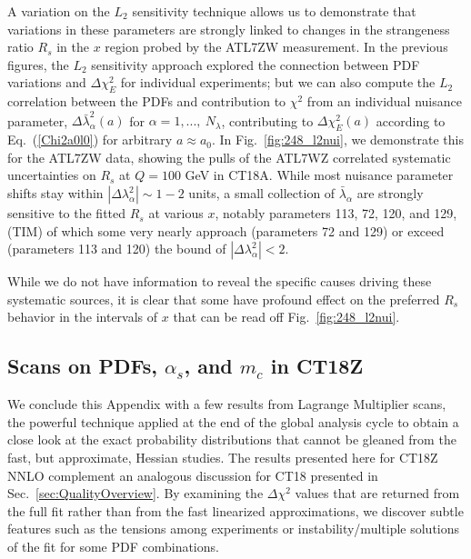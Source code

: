 A variation on the $L_2$ sensitivity technique allows us to demonstrate that
variations in these parameters are strongly linked to changes in the
strangeness ratio $R_s$ in the $x$ region probed by the ATL7ZW
measurement.
In the previous figures, the $L_2$ sensitivity approach explored the
connection between PDF variations and $\Delta \chi^2_E$
for individual experiments; but we can also compute
the $L_2$ correlation between the PDFs and contribution to $\chi^2$ from an individual nuisance parameter,  
$\Delta \bar \lambda^2_\alpha(a)$ 
for $\alpha=1,...,\ N_\lambda$, contributing to $\Delta \chi^2_E(a)$ according to Eq.~(\ref{Chi2a0l0}) for arbitrary $a\approx a_0$. In Fig.~\ref{fig:248_l2nui}, we demonstrate this for the ATL7ZW data, showing the
pulls of the ATL7WZ correlated systematic uncertainties on $R_s$ at $Q=100$ GeV in CT18A. While most nuisance parameter shifts
stay within $|\Delta \lambda^2_\alpha|\! \sim\! 1\!-\!2$ units, a
small collection of $\bar \lambda_\alpha$
are strongly sensitive to the fitted $R_s$ at various $x$,
notably parameters 113, 72, 120, and 129,
%
{\color{red} (TIM) of which
some very nearly approach (parameters 72 and 129) or exceed (parameters 113 and 120)
the bound of $|\Delta \lambda^2_\alpha|\! <\!2$.
}

While we do not have information to reveal the specific causes driving
these systematic sources, it is clear that some have profound
effect on the preferred $R_s$ behavior in the intervals of $x$ that
can be read off Fig.~\ref{fig:248_l2nui}.


\subsection{Scans on PDFs, $\alpha_s$, and $m_c$ in CT18Z
\label{sec:LMCT18Z}
}

We conclude this Appendix with a few results from Lagrange Multiplier
scans, the powerful technique applied at the end of the global
analysis cycle to obtain a close look at the exact probability
distributions that cannot be gleaned from the fast, but approximate,
Hessian studies. The results presented here for CT18Z NNLO
complement an analogous discussion for CT18
presented in Sec.~\ref{sec:QualityOverview}. By examining the
$\Delta \chi^2$ values that are returned from the full
fit rather than from the fast linearized approximations,
we discover subtle features such as the tensions
among experiments or instability/multiple solutions of the fit for
some PDF combinations. 
%
%

